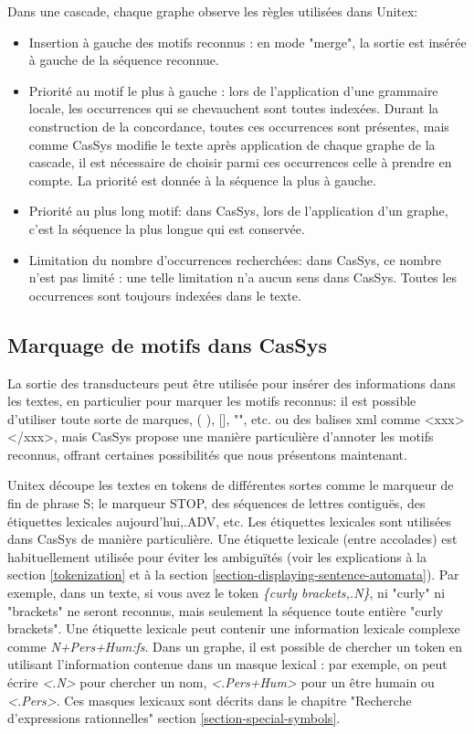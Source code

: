 Dans une cascade, chaque graphe observe les règles utilisées dans Unitex:
\begin{itemize}
	\item Insertion à gauche des motifs reconnus : en mode "merge", la sortie est insérée à
	gauche de la séquence reconnue.
	\item	Priorité au motif le plus à gauche : lors de l'application d'une grammaire locale,
	les occurrences qui se chevauchent sont toutes indexées. 
	Durant la construction de la concordance, toutes ces occurrences sont présentes, mais comme CasSys
	modifie le texte après application de chaque 
	graphe de la cascade, il est nécessaire de choisir parmi ces occurrences celle à prendre en
	compte. La priorité est donnée à la séquence la plus à gauche.
	\item Priorité au plus long motif: dans CasSys, lors de l'application d'un graphe, c'est la
	séquence la plus longue qui est conservée.
	\item	Limitation du nombre d'occurrences recherchées: dans CasSys, ce nombre n'est pas
	limité : une telle limitation n'a aucun sens dans CasSys. Toutes les occurrences sont
	toujours indexées dans le texte.
\end{itemize}

\subsection{Marquage de motifs dans CasSys}

La sortie des transducteurs peut être utilisée pour insérer des informations dans les textes, en
particulier pour marquer les motifs reconnus: il est possible d'utiliser toute sorte de marques, 
( ), [], "", etc. ou des balises xml comme <xxx> </xxx>, mais CasSys propose une manière
particulière d'annoter les motifs reconnus, offrant certaines possibilités que nous présentons
maintenant.  

\bigskip
\noindent Unitex découpe les textes en tokens de différentes sortes comme le marqueur de fin de
phrase {S}; le marqueur {STOP}, des séquences de lettres contiguës, des étiquettes lexicales
{aujourd'hui,.ADV}, etc. Les étiquettes lexicales sont utilisées dans CasSys de manière
particulière. Une étiquette lexicale (entre accolades) est habituellement utilisée pour éviter les
ambiguïtés (voir les explications à la section \ref{tokenization} et à la section
\ref{section-displaying-sentence-automata}). 
Par exemple, dans un texte, si vous avez le token \emph{\{curly brackets,.N\}}, ni "curly" ni
"brackets" ne seront reconnus, mais seulement la séquence toute entière
"curly brackets". Une étiquette lexicale peut contenir une information lexicale complexe comme
\emph{N+Pers+Hum:fs}.
Dans un graphe, il est possible de chercher un token en utilisant l'information contenue dans un
masque lexical : par exemple, on peut écrire \emph{<.N>} pour chercher 
un nom, \emph{<.Pers+Hum>} pour un être humain ou \emph{<.Pers>}. Ces masques lexicaux sont décrits
dans le chapitre "Recherche d'expressions rationnelles" section
\ref{section-special-symbols}.
 
